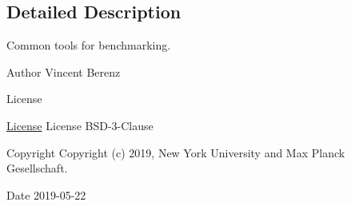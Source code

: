 \subsection{Detailed Description}
Common tools for benchmarking. 

\begin{DoxyAuthor}{Author}
Vincent Berenz 
\end{DoxyAuthor}
\begin{DoxyRefDesc}{License}
\item[\hyperlink{license__license000018}{License}]License B\+S\+D-\/3-\/\+Clause \end{DoxyRefDesc}
\begin{DoxyCopyright}{Copyright}
Copyright (c) 2019, New York University and Max Planck Gesellschaft. 
\end{DoxyCopyright}
\begin{DoxyDate}{Date}
2019-\/05-\/22 
\end{DoxyDate}
